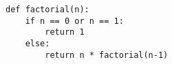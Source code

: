 \begin{lstlisting}
def factorial(n):
    if n == 0 or n == 1:
        return 1
    else:
        return n * factorial(n-1)
\end{lstlisting}
